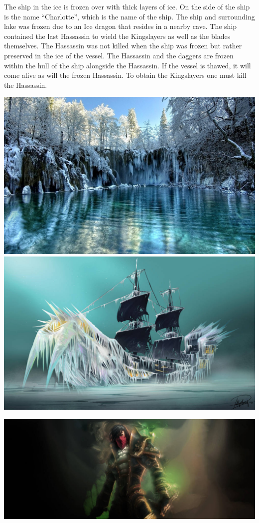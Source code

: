 The ship in the ice is frozen over with thick layers of ice. On the side of the ship is the name ``Charlotte'', which is the name of the ship. The ship and surrounding lake was frozen due to an Ice dragon that resides in a nearby cave. The ship contained the last Hassassin to wield the Kingslayers as well as the blades themselves. The Hassassin was not killed when the ship was frozen but rather preserved in the ice of the vessel. The Hassassin and the daggers are frozen within the hull of the ship alongside the Hassassin. If the vessel is thawed, it will come alive as will the frozen Hassassin. To obtain the Kingslayers one must kill the Hassassin.

\begin{center}	
	\includegraphics[width=0.485\linewidth]{img/terrain/winter-frozen-lake-reflection-blue-ice-green-trees-wallpaper-quotes.jpg}
	\includegraphics[width=0.50\linewidth]{img/ice_pirate_ship_by_pollychong_da47p92-fullview.jpg}
	
	\dndline
		
	\includegraphics[width=\linewidth]{img/WoW/edwinvancleef.jpg}
\end{center}

